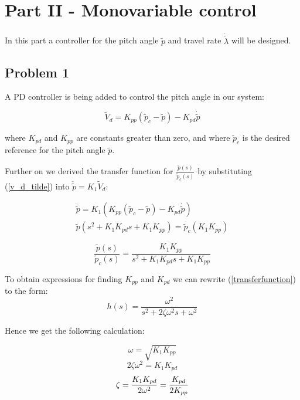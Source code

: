 \section{Part II - Monovariable control}

In this part a controller for the pitch angle $\tilde{p}$ and travel rate $\dot{\tilde{\lambda}}$ will be designed. 

\subsection{Problem 1}
A PD controller is being added to control the pitch angle in our system: 

\begin{equation}
    \label{v_d_tilde}
    \tilde{V}_d = K_{pp}(\tilde{p}_c-\tilde{p}) - K_{pd}\dot{\tilde{p}}
\end{equation}

where $K_{pd}$ and $K_{pp}$ are constants greater than zero, and where $\tilde{p}_c$ is the desired reference for the pitch angle $\tilde{p}$. \newline

Further on we derived the transfer function for $\frac{\tilde{p}(s)}{\tilde{p}_c(s)}$ by substituting (\ref{v_d_tilde}) into $\ddot{\tilde{p}} = K_1\tilde{V}_d$:

\begin{align*}
  \ddot{\tilde{p}} = K_1(K_{pp}(\tilde{p}_c-\tilde{p}) - K_{pd}\dot{\tilde{p}}) \\
  \tilde{p}(s^{2}+K_1K_{pd}s+K_1K_{pp}) = \tilde{p}_c(K_1K_{pp})
\end{align*}

\begin{equation}
    \label{transferfunction}
    \frac{\tilde{p}(s)}{\tilde{p}_c(s)} = \frac{K_1K_{pp}}{s^{2}+K_1K_{pd}s+K_1K_{pp}}
\end{equation}
\newline

To obtain expressions for finding $K_{pp}$ and $K_{pd}$ we can rewrite (\ref{transferfunction}) to the form:
\begin{equation}
    h(s)= \frac{\omega^{2}}{s^{2}+2\zeta\omega^{2}s + \omega^{2}}
\end{equation}
\newline

Hence we get the following calculation:

\begin{equation}
    \omega = \sqrt{K_1K_{pp}}
\end{equation}
\begin{equation}
       2\zeta\omega^{2} = K_1K_{pd} \nonumber
\end{equation}
\begin{equation}
    \zeta = \frac{K_1K_{pd}}{2\omega^{2}} = \frac{K_{pd}}{2K_{pp}}
    \raisetag{2\normalbaselineskip}
\end{equation}

